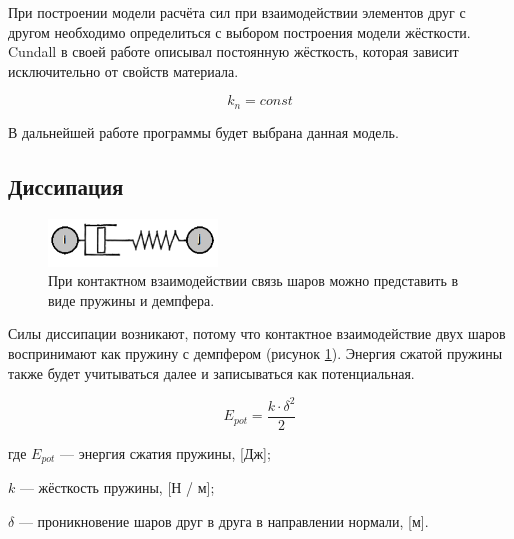 \documentclass[a4paper]{article}
\begin{document}
При построении модели расчёта сил при взаимодействии элементов друг с другом необходимо определиться с выбором построения модели жёсткости. 
Cundall в своей работе \cite{cundall} описывал постоянную жёсткость, которая зависит исключительно от свойств материала.

\begin{equation}
\label{kn_const}
k_n = const
\end{equation}

В дальнейшей работе программы будет выбрана данная модель.




\subsection{Диссипация}
\label{dempf_subsection}

\begin{figure}[h!]
	\centering
	\label{pic:dempf}
	\includegraphics[width=0.4\textwidth]{dempf}
	\caption{При контактном взаимодействии связь шаров можно представить в виде пружины и демпфера.}
\end{figure} 


Силы диссипации возникают, потому что контактное взаимодействие двух шаров воспринимают как пружину с демпфером (рисунок \ref{pic:dempf}). 
Энергия сжатой пружины также будет учитываться далее и записываться как потенциальная.

\[
E_{pot} = \dfrac{k \cdot \delta^2}{2}
\]

где $E_{pot}$ --- энергия сжатия пружины, [Дж];

$k$ --- жёсткость пружины, [Н / м];

$\delta$ --- проникновение шаров друг в друга в направлении нормали, [м].
\end{document}
